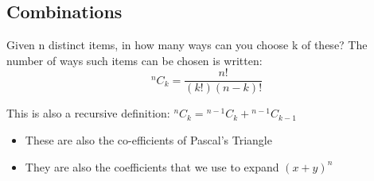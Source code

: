\documentclass[11pt]{article}
\theoremstyle{definition}
\newcommand*{\Co}[2]{{}^{#1}C_{#2}}%
\begin{document}
\subsection{Combinations}
Given n distinct items, in how many ways can you choose k of these?
The number of ways such items can be chosen is written:
$$\Co{n}{k} = \frac{n!}{(k!)(n-k)!}$$

This is also a recursive definition:
$\Co{n}{k} = \Co{n-1}{k} + \Co{n-1}{k-1}$

\begin{itemize}[label={--}]
\item These are also the co-efficients of Pascal's Triangle
\item They are also the coefficients that we use to expand $(x+y)^n$
\end{itemize}
\end{document}
